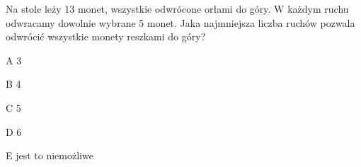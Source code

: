 \begin{tresc}
Na stole leży 13 monet, wszystkie odwrócone orłami do góry. W każdym ruchu odwracamy dowolnie wybrane 5 monet. Jaka najmniejsza liczba ruchów pozwala odwrócić wszystkie monety reszkami do góry?
\end{tresc}
\begin{wariant}{A} 3 \end{wariant}
\begin{wariant}{B} 4 \end{wariant}
\begin{wariant}{C} 5 \end{wariant}
\begin{wariant}{D} 6 \end{wariant}
\begin{wariant}{E} jest to niemożliwe \end{wariant}
